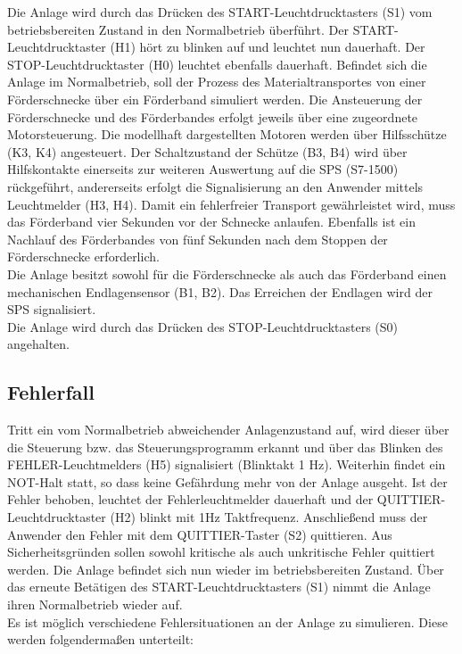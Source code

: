 Die Anlage wird durch das Drücken des START-Leuchtdrucktasters (S1) vom betriebsbereiten Zustand in den Normalbetrieb überführt. Der START-Leuchtdrucktaster (H1) hört zu blinken auf und leuchtet nun dauerhaft. Der STOP-Leuchtdrucktaster (H0) leuchtet ebenfalls dauerhaft. Befindet sich die Anlage im Normalbetrieb, soll der Prozess des Materialtransportes von einer Förderschnecke über ein Förderband simuliert werden. Die Ansteuerung der Förderschnecke und des Förderbandes erfolgt jeweils über eine zugeordnete Motorsteuerung. Die modellhaft dargestellten Motoren werden über Hilfsschütze (K3, K4) angesteuert. Der Schaltzustand der Schütze (B3, B4) wird über Hilfskontakte einerseits zur weiteren Auswertung auf die SPS (S7-1500) rückgeführt, andererseits erfolgt die Signalisierung an den Anwender mittels Leuchtmelder (H3, H4). Damit ein fehlerfreier Transport gewährleistet wird, muss das Förderband vier Sekunden vor der Schnecke anlaufen. Ebenfalls ist ein Nachlauf des Förderbandes von fünf Sekunden nach dem Stoppen der Förderschnecke erforderlich. \\
Die Anlage besitzt sowohl für die Förderschnecke als auch das Förderband einen mechanischen Endlagensensor (B1, B2). Das Erreichen der Endlagen wird der SPS signalisiert. \\
Die Anlage wird durch das Drücken des STOP-Leuchtdrucktasters (S0) angehalten.

\subsection{Fehlerfall}

Tritt ein vom Normalbetrieb abweichender Anlagenzustand auf, wird dieser über die Steuerung bzw. das Steuerungsprogramm erkannt und über das Blinken des FEHLER-Leuchtmelders (H5) signalisiert (Blinktakt 1 Hz). Weiterhin findet ein NOT-Halt statt, so dass keine Gefährdung mehr von der Anlage ausgeht. Ist der Fehler behoben, leuchtet der Fehlerleuchtmelder dauerhaft und der QUITTIER-Leuchtdrucktaster (H2) blinkt mit 1Hz Taktfrequenz. Anschließend muss der Anwender den Fehler mit dem QUITTIER-Taster (S2) quittieren. Aus Sicherheitsgründen sollen sowohl kritische als auch unkritische Fehler quittiert werden. Die Anlage befindet sich nun wieder im betriebsbereiten Zustand. Über das erneute Betätigen des START-Leuchtdrucktasters (S1) nimmt die Anlage ihren Normalbetrieb wieder auf. \\
Es ist möglich verschiedene Fehlersituationen an der Anlage zu simulieren. Diese werden folgendermaßen unterteilt:

